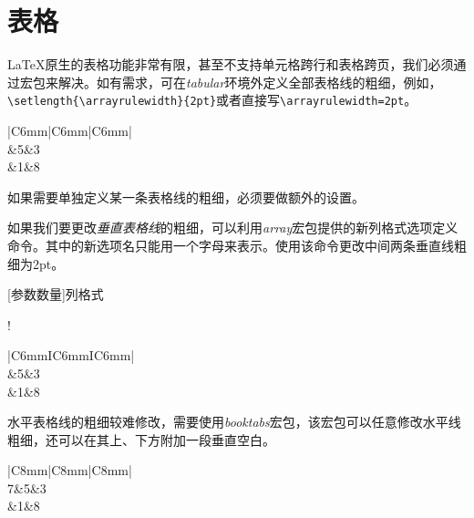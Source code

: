 \section{表格}
\LaTeX 原生的表格功能非常有限，甚至不支持单元格跨行和表格跨页，我们必须通过宏包来解决。如有需求，可在\emph{tabular}环境外定义全部表格线的粗细，例如，\lstinline|\setlength{\arrayrulewidth}{2pt}|或者直接写\lstinline|\arrayrulewidth=2pt|。

\begin{codeshow}
\centering
\arrayrulewidth=1pt%
\begin{tabular}
    {|C{6mm}|C{6mm}|C{6mm}|}
    \hline
    \\
    &5&3\\
    &1&8\\
    \hline
\end{tabular}
\end{codeshow}

如果需要单独定义某一条表格线的粗细，必须要做额外的设置。

如果我们要更改\emph{垂直表格线}的粗细，可以利用\emph{array}宏包提供的新列格式选项定义命令。其中的新选项名只能用一个字母来表示。使用该命令更改中间两条垂直线粗细为2pt。

\begin{latex}
\newcolumntype{新选项名称}[参数数量]{列格式}
\end{latex}

\begin{codeshow}
    \centering
    \newcolumntype{I}
        {!{\vrule width 2pt}}
    \begin{tabular}
        {|C{6mm}IC{6mm}IC{6mm}|}
        \hline 
        \\
        &5&3\\
        &1&8\\
        \hline
    \end{tabular}
\end{codeshow}

水平表格线的粗细较难修改，需要使用\emph{booktabs}宏包，该宏包可以任意修改水平线粗细，还可以在其上、下方附加一段垂直空白。

\begin{codeshow}
    \centering
    \begin{tabular}
        {|C{8mm}|C{8mm}|C{8mm}|}
        \hline 
        \\
        \specialrule{2pt}{0pt}{0pt}
        7&5&3\\
        &1&8\\
        \hline
    \end{tabular}
\end{codeshow}

